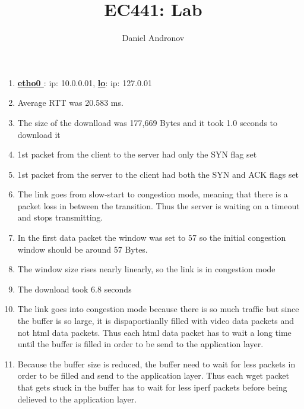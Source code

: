 \documentclass[12pt]{article}
\title{EC441: Lab \hwNum{}}
\author{Daniel Andronov}
\date{\displaydate{date}}
\begin{document}
\maketitle
\newpage

\begin{enumerate}[label=\textbf{Question\arabic*)},leftmargin=*,align=left]
	\item \textbf{ \underline{ etho0 }}: ip: 10.0.0.01, \textbf{\underline{lo}}: ip: 127.0.01
	\item Average RTT was 20.583 ms.
	\item The size of the downlload was 177,669 Bytes and it took 1.0 seconds to download it
	\item 1st packet from the client to the server had only the SYN flag set
	\item 1st packet from the server to the client had both the SYN and ACK flags set
	\item The link goes from slow-start to congestion mode, meaning that there is a packet loss in between the transition. Thus the server is waiting on a timeout and stops transmitting.
	\item In the first data packet the window was set to 57 so the initial congestion window should be around 57 Bytes.
	\item The window size rises nearly linearly, so the link is in congestion mode
	\item The download took 6.8 seconds
	\item  The link goes into congestion mode because there is so much traffic but since the buffer is so large, it is dispaportianlly filled with video data packets and not html data packets. Thus each html data packet has to wait a long time until the buffer is filled in order to be send to the application layer.
	\item Because the buffer size is reduced, the buffer need to wait for less packets in order to be filled and send to the application layer. Thus each wget packet that gets stuck in the buffer has to wait for less iperf packets before being delieved to the application layer. 
\end{enumerate}
\end{document}

